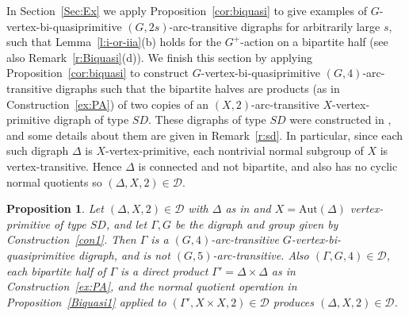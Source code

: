 \documentclass[11pt]{amsart}
\newtheorem{proposition}[theorem]{Proposition}
\newcommand{\Aut}{\mathrm{Aut}}
\newcommand\DD{{\mathscr{D}}}
\begin{document}
\medskip
In Section~\ref{Sec:Ex} we apply Proposition~\ref{cor:biquasi} to give examples of  $G$-vertex-bi-quasiprimitive $(G,2s)$-arc-transitive digraphs for arbitrarily large $s$, such that Lemma~\ref{l:i-or-iia}(b) holds for the $G^+$-action on a bipartite half (see also Remark~\ref{r:Biquasi}(d)). We finish this section by applying Proposition~\ref{cor:biquasi} to construct  $G$-vertex-bi-quasiprimitive $(G,4)$-arc-transitive digraphs such that the bipartite halves are products (as in Construction~\ref{ex:PA}) of two copies of an \((X,2)\)-arc-transitive \(X\)-vertex-primitive digraph of type \(SD\). These digraphs of type \(SD\) were constructed in \cite[Construction 3.1]{quasi}, and some  details about them are given in Remark~\ref{r:sd}. In particular, since each such digraph $\Delta$ is $X$-vertex-primitive, each nontrivial normal subgroup of $X$ is vertex-transitive. Hence $\Delta$ is connected and not bipartite, and also has no cyclic normal quotients so $(\Delta, X, 2)\in\DD$. 


\begin{proposition}\label{p:SD}
    Let $(\Delta, X, 2)\in\DD$ with $\Delta$ as in  \cite[Construction 3.1]{quasi} and $X=\Aut(\Delta)$ vertex-primitive of type \(SD\), and let $\Gamma, G$ be the digraph and group given by Construction~\ref{con1}. Then $\Gamma$ is a $(G,4)$-arc-transitive $G$-vertex-bi-quasiprimitive digraph, and is not $(G,5)$-arc-transitive. Also $(\Gamma, G, 4)\in\DD$,  each bipartite half of  $\Gamma$ is a direct product $\Gamma'=\Delta\times\Delta$ as in Construction~\ref{ex:PA}, and the normal quotient operation in Proposition~\ref{Biquasi1} applied to $(\Gamma', X\times X, 2)\in\DD$ produces $(\Delta, X, 2)\in\DD$.  
\end{proposition}
\end{document}
